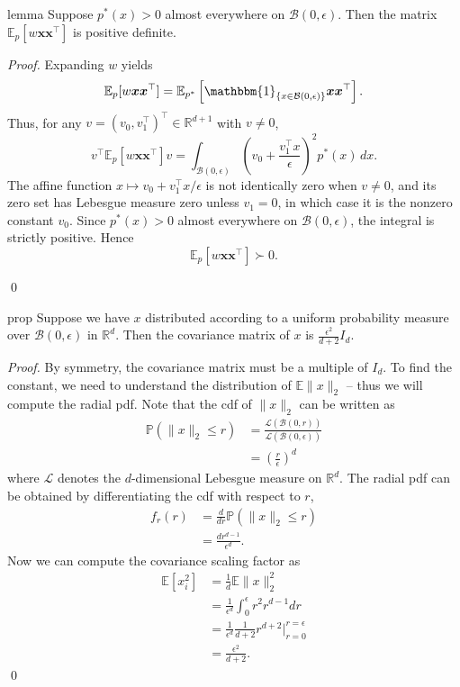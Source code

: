 \documentclass[11pt]{article}
\begin{document}
\begin{appendices}
\begin{restatable}{lemma}{} \label{lemma: pd}
    Suppose $p^*(x)>0$ almost everywhere on $\mathcal{B}(0,\epsilon)$. Then the matrix $\mathbb{E}_{p}[w\boldsymbol{x}\boldsymbol{x}^{\top}]$ is positive definite.
\end{restatable}
\noindent \textit{Proof.} Expanding $w$ yields
\[
    \mathbb{E}_{p}[w\boldsymbol{x}\boldsymbol{x}^{\top}]
    =
    \mathbb{E}_{p^*}\left[\mathbbm{1}_{\{x\in\mathcal{B}(0,\epsilon)\}}\boldsymbol{x}\boldsymbol{x}^{\top}\right].
\]
Thus, for any $v=(v_0,v_1^\top)^\top\in\mathbb{R}^{d+1}$ with $v\neq0$,
\[
    v^\top\mathbb{E}_{p}[w\boldsymbol{x}\boldsymbol{x}^{\top}]v
    =
    \int_{\mathcal{B}(0,\epsilon)}
    \left(v_0+\frac{v_1^\top x}{\epsilon}\right)^2
    p^*(x)\,dx.
\]
The affine function $x\mapsto v_0+v_1^\top x/\epsilon$ is not identically zero when $v\neq0$, and its zero set has Lebesgue measure zero unless $v_1=0$, in which case it is the nonzero constant $v_0$. Since $p^*(x)>0$ almost everywhere on $\mathcal{B}(0,\epsilon)$, the integral is strictly positive. Hence
\[
    \mathbb{E}_{p}[w\boldsymbol{x}\boldsymbol{x}^{\top}]\succ0.
\]

\qed{}



\begin{restatable}{prop}{} \label{prop: spherical cov}
    Suppose we have $x$ distributed according to a uniform probability measure over $\mathcal{B}(0,\epsilon)$ in $\mathbb{R}^d$. Then the covariance matrix of $x$ is $\frac{\epsilon^2}{d+2}I_d$. 
\end{restatable}
\noindent \textit{Proof.} By symmetry, the covariance matrix must be a multiple of $I_d$. To find the constant, we need to understand the distribution of $\mathbb{E}\|x\|_2$ -- thus we will compute the radial pdf. Note that the cdf of $\|x\|_2$ can be written as
\begin{align*}
    \mathbb{P}(\|x\|_2 \leq r) &= \frac{\mathcal{L}(\mathcal{B}(0,r))}{\mathcal{L}(\mathcal{B}(0,\epsilon))} \\
    &= \left(\frac{r}{\epsilon }\right)^d
\end{align*}
where $\mathcal{L}$ denotes the $d$-dimensional Lebesgue measure on $\mathbb{R}^d$. The radial pdf can be obtained by differentiating the cdf with respect to $r$,
\begin{align*}
    f_r(r) &= \frac{d}{dr}\mathbb{P}(\|x\|_2\leq r) \\
    &= \frac{dr^{d-1}}{\epsilon^d}.
\end{align*}
Now we can compute the covariance scaling factor as 
\begin{align}
    \mathbb{E}[x_i^2] &= \frac{1}{d}\mathbb{E}\|x\|_2^2 \\
    &=\frac{1}{\epsilon^d}\int_{0}^{\epsilon}r^2r^{d-1}dr \\
    &= \frac{1}{\epsilon^d}\frac{1}{d+2}r^{d+2} \Bigg|^{r=\epsilon}_{r=0} \\
    &= \frac{\epsilon^2}{d+2}. \label{eq: uniform eps-ball coordinate variance}
\end{align}
\qed{}


\end{appendices}
\end{document}
